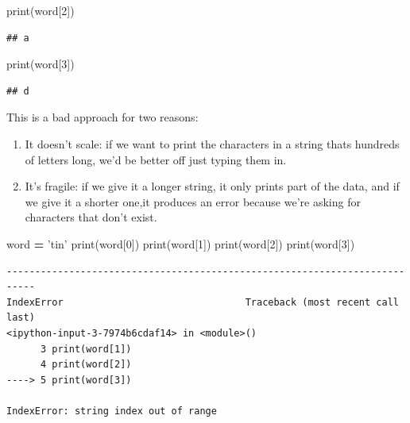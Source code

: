 \documentclass[]{book}
\newenvironment{Shaded}{\begin{snugshade}}{\end{snugshade}}
\newcommand{\BuiltInTok}[1]{#1}
\newcommand{\DecValTok}[1]{\textcolor[rgb]{0.00,0.00,0.81}{#1}}
\newcommand{\NormalTok}[1]{#1}
\newcommand{\OperatorTok}[1]{\textcolor[rgb]{0.81,0.36,0.00}{\textbf{#1}}}
\newcommand{\StringTok}[1]{\textcolor[rgb]{0.31,0.60,0.02}{#1}}
\providecommand{\tightlist}{%
  \setlength{\itemsep}{0pt}\setlength{\parskip}{0pt}}
\theoremstyle{definition}
\theoremstyle{definition}
\theoremstyle{definition}
\theoremstyle{remark}
\begin{document}
\begin{Shaded}
\begin{Highlighting}[]
\BuiltInTok{print}\NormalTok{(word[}\DecValTok{2}\NormalTok{])}
\end{Highlighting}
\end{Shaded}

\begin{verbatim}
## a
\end{verbatim}

\begin{Shaded}
\begin{Highlighting}[]
\BuiltInTok{print}\NormalTok{(word[}\DecValTok{3}\NormalTok{])}
\end{Highlighting}
\end{Shaded}

\begin{verbatim}
## d
\end{verbatim}

This is a bad approach for two reasons:

\begin{enumerate}
\def\labelenumi{\arabic{enumi}.}
\tightlist
\item
  It doesn't scale: if we want to print the characters in a string thats
  hundreds of letters long, we'd be better off just typing them in.
\item
  It's fragile: if we give it a longer string, it only prints part of
  the data, and if we give it a shorter one,it produces an error because
  we're asking for characters that don't exist.
\end{enumerate}

\begin{Shaded}
\begin{Highlighting}[]
\NormalTok{word }\OperatorTok{=} \StringTok{'tin'}
\BuiltInTok{print}\NormalTok{(word[}\DecValTok{0}\NormalTok{])}
\BuiltInTok{print}\NormalTok{(word[}\DecValTok{1}\NormalTok{])}
\BuiltInTok{print}\NormalTok{(word[}\DecValTok{2}\NormalTok{])}
\BuiltInTok{print}\NormalTok{(word[}\DecValTok{3}\NormalTok{])}
\end{Highlighting}
\end{Shaded}

\begin{verbatim}
---------------------------------------------------------------------------
IndexError                                Traceback (most recent call last)
<ipython-input-3-7974b6cdaf14> in <module>()
      3 print(word[1])
      4 print(word[2])
----> 5 print(word[3])

IndexError: string index out of range
\end{verbatim}
\end{document}
